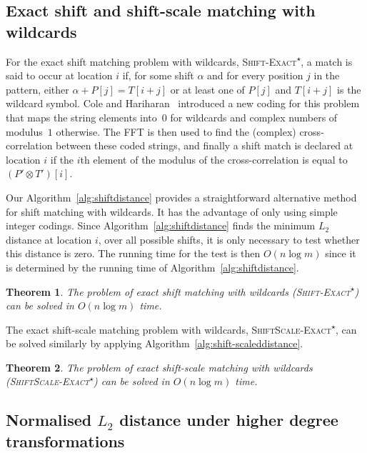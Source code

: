 \documentclass[11pt]{article}
\newcommand{\wildcard}{\ensuremath{\star}\xspace}
\newcommand{\sExactWild}{\textsc{Shift-Exact\textsuperscript{\wildcard}}\xspace}
\newcommand{\ssExactWild}{\textsc{ShiftScale-Exact\textsuperscript{\wildcard}}\xspace}
\theoremstyle{plain}
\newtheorem{theorem}{Theorem}[]
\theoremstyle{definition}
\begin{document}
\subsection{Exact shift and shift-scale matching with wildcards}

For the exact shift matching problem with wildcards, \sExactWild, a match is said to occur at location $i$ if, for some shift $\alpha$ and  for every position $j$ in the pattern, either $\alpha + P[j]=T[i+j]$ or at least one of $P[j]$ and $T[i+j]$ is the wildcard symbol. Cole and Hariharan~\cite{CH:2002} introduced a new coding for this problem that maps the string elements into~$0$ for wildcards and complex numbers of modulus~$1$ otherwise.  The FFT is then used to find the (complex) cross-correlation between these coded strings, and finally a shift match is declared at location $i$ if the $i$th element of the modulus of the cross-correlation is equal to $(P'\otimes T')[i]$.

Our Algorithm~\ref{alg:shiftdistance} provides a straightforward alternative method for shift matching with wildcards.  It has the advantage of only using simple integer codings.  Since Algorithm~\ref{alg:shiftdistance} finds the minimum $L_2$ distance at location $i$, over all possible shifts, it is only necessary to test whether this distance is zero.  The running time for the test is then $O(n\log{m})$ since it is determined by the running time of Algorithm~\ref{alg:shiftdistance}.

\begin{theorem}
    \label{thm:sExactWild}
    The problem of exact shift matching with wildcards (\sExactWild) can be solved in $O(n\log{m})$ time.
\end{theorem}

The exact shift-scale matching problem with wildcards, \ssExactWild, can be solved similarly by applying Algorithm~\ref{alg:shift-scaleddistance}.

\begin{theorem}
    \label{thm:ssExactWild}
    The problem of exact shift-scale matching with wildcards (\ssExactWild) can be solved in $O(n\log{m})$ time.
\end{theorem}


\subsection{Normalised $L_2$ distance under higher degree transformations}
\end{document}
